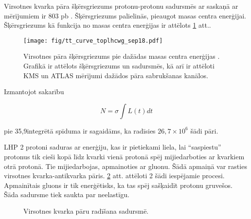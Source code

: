 Virsotnes kvarka pāra šķērsgriezums protonu-protonu sadursmēs ar \TeV saskaņā ar mērījumiem ir 803 pb \cite{Sirunyan:2018goh}. Šķērsgriezums palielinās, pieaugot masas centra enerģijai. Šķērsgriezums kā funkcija no masas centra enerģijas ir attēlots \ref{fig:tt_curve_toplhcwg_sep18} att..

\begin{figure}[hbtp]

  \centering
  \texttt{[image: fig/tt\_curve\_toplhcwg\_sep18.pdf]}
  \caption{Virsotnes pāra šķērsgriezums pie dažādas masas centra enerģijas \cite{twiki:tt_curve_toplhcwg_sep18}. Grafikā ir attēlots šķērsgriezums \Pp\Pp un \Pp\Pap sadursmēs, kā arī ir attēloti KMS un ATLAS mērījumi dažādos \ttbar pāra sabrukšanas kanālos.}
  \label{fig:tt_curve_toplhcwg_sep18}
  
\end{figure}

Izmantojot sakarību

\begin{equation}
N=\sigma\int L(t)dt
\end{equation}

pie 35,9\fbinv integrētā spīduma ir sagaidāms, ka radīsies $26,7\times10^{6}$ šādi pāri. 

LHP 2 protoni saduras ar enerģiju, kas ir pietiekami liela, lai ``saspiestu'' protonus tik cieši kopā līdz kvarki vienā protonā spēj mijiedarboties ar kvarkiem otrā protonā. Tie mijiedarbojas, apmainoties ar gluonu. Šādā apmaiņā var rasties virsotnes kvarka-antikvarka pāris. \ref{fig:top_quark_productions} att. attēloti 2 šādi iespējamie procesi. Apmainītais gluons ir tik enerģētisks, ka tas spēj sašķaidīt protonu \gls{gruvešos}. Šāda sadursme tiek saukta par neelastīgu.

\begin{figure}[h!]
  \centering
  \def\twidth{0.3}
  \hfil

  \caption{Virsotnes kvarka pāru radīšana \Pp\Pp sadursmē.}
  \label{fig:top_quark_productions}
\end{figure}

